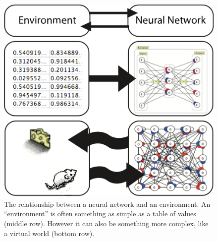 \begin{figure}[h]
\centering
\includegraphics[scale=.7]{./images/nn_environment.png}
\caption[Pamela Payne.]{The relationship between a neural network and an environment. An ``environment'' is often something as simple as a table of values (middle row). However it can also be something more complex, like a virtual world (bottom row).}
\label{nn_environment}
\end{figure}

